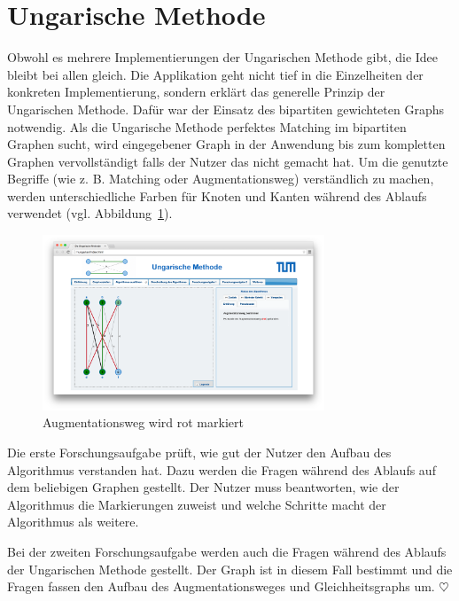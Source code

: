 \section{Ungarische Methode} %

Obwohl es mehrere Implementierungen der Ungarischen Methode gibt, die Idee bleibt bei allen gleich. Die Applikation geht nicht tief in die Einzelheiten der konkreten Implementierung, sondern erklärt das generelle Prinzip der Ungarischen Methode. Dafür war der Einsatz des bipartiten gewichteten Graphs notwendig. Als die Ungarische Methode perfektes Matching im bipartiten Graphen sucht, wird eingegebener Graph in der Anwendung bis zum kompletten Graphen vervollständigt falls der Nutzer das nicht gemacht hat. Um die genutzte Begriffe (wie z. B. Matching oder Augmentationsweg) verständlich zu machen, werden unterschiedliche Farben für Knoten und Kanten während des Ablaufs verwendet (vgl. Abbildung~\ref{fig:hungarian-colors}).

\begin{figure}[h!]
	\centering
	\includegraphics[width=0.75\textwidth]{figures/hungarian-colors}
	\caption[Ungarische Methode: Augmentationsweg]{Augmentationsweg wird rot markiert}\label{fig:hungarian-colors}
\end{figure}

Die erste Forschungsaufgabe prüft, wie gut der Nutzer den Aufbau des Algorithmus verstanden hat. Dazu werden die Fragen während des Ablaufs auf dem beliebigen Graphen gestellt. Der Nutzer muss beantworten, wie der Algorithmus die Markierungen zuweist und welche Schritte macht der Algorithmus als weitere. 

Bei der zweiten Forschungsaufgabe werden auch die Fragen während des Ablaufs der Ungarischen Methode gestellt. Der Graph ist in diesem Fall bestimmt und die Fragen fassen den Aufbau des Augmentationsweges und Gleichheitsgraphs um. \hfill$\heartsuit$

